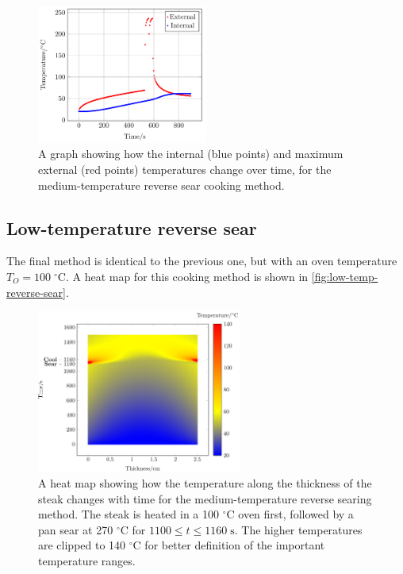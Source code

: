 \documentclass[11pt]{article}
\begin{document}
	\begin{figure}[H]
		\centering
		\includegraphics[width=0.5\textwidth]{./img/temps-med-reverse.png}
		\caption{A graph showing how the internal (blue points) and maximum external (red points) temperatures change over time, for the medium-temperature reverse sear cooking method.}
		\label{fig:med-reverse-sear-temps}
	\end{figure}
	
	\subsection{Low-temperature reverse sear}
	
	The final method is identical to the previous one, but with an oven temperature $T_O = 100\;^\circ\text{C}$. A heat map for this cooking method is shown in \autoref{fig:low-temp-reverse-sear}.
	
	\begin{figure}[H]
		\centering
		\includegraphics[width=0.6\textwidth]{./img/low-temp-reverse-sear.png}
		\caption{A heat map showing how the temperature along the thickness of the steak changes with time for the medium-temperature reverse searing method. The steak is heated in a 100 $^\circ\text{C}$ oven first, followed by a pan sear at 270 $^\circ \text{C}$ for $1100 \leq t \leq 1160\;\mathrm{s}$. The higher temperatures are clipped to 140 $^\circ\text{C}$ for better definition of the important temperature ranges.}
		\label{fig:low-temp-reverse-sear}
	\end{figure}
	
\end{document}
